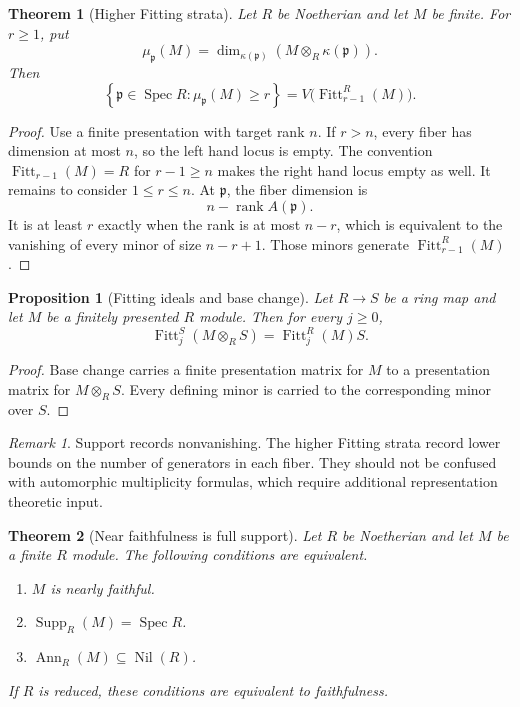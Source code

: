 \documentclass[11pt]{amsart}
\newtheorem{theorem}{Theorem}[section]
\newtheorem{proposition}[proposition]{Proposition}
\theoremstyle{definition}
\theoremstyle{remark}
\newtheorem{remark}[remark]{Remark}
\newcommand{\Spec}{\operatorname{Spec}}
\newcommand{\Supp}{\operatorname{Supp}}
\newcommand{\Ann}{\operatorname{Ann}}
\newcommand{\Fitt}{\operatorname{Fitt}}
\newcommand{\rank}{\operatorname{rank}}
\newcommand{\nil}{\operatorname{Nil}}
\newcommand{\frakp}{\mathfrak p}
\begin{document}
\begin{theorem}[Higher Fitting strata]\label{thm:higher_fitting_strata}
Let \(R\) be Noetherian and let \(M\) be finite. For \(r\geq1\), put
\[
\mu_{\frakp}(M)
=
\dim_{\kappa(\frakp)}
\left(M\otimes_R\kappa(\frakp)\right).
\]
Then
\[
\boxed{
\left\{
\frakp\in\Spec R:
\mu_{\frakp}(M)\geq r
\right\}
=
V\bigl(\Fitt_{r-1}^R(M)\bigr).
}
\]
\end{theorem}

\begin{proof}
Use a finite presentation with target rank \(n\). If \(r>n\), every fiber has dimension at most \(n\), so the left hand locus is empty. The convention \(\Fitt_{r-1}(M)=R\) for \(r-1\geq n\) makes the right hand locus empty as well. It remains to consider \(1\leq r\leq n\). At \(\frakp\), the fiber dimension is
\[
n-\rank A(\frakp).
\]
It is at least \(r\) exactly when the rank is at most \(n-r\), which is equivalent to the vanishing of every minor of size \(n-r+1\). Those minors generate \(\Fitt_{r-1}^R(M)\).
\end{proof}

\begin{proposition}[Fitting ideals and base change]\label{prop:fitting_base_change}
Let \(R\to S\) be a ring map and let \(M\) be a finitely presented \(R\) module. Then for every \(j\geq0\),
\[
\boxed{
\Fitt_j^S(M\otimes_RS)
=
\Fitt_j^R(M)S.
}
\]
\end{proposition}

\begin{proof}
Base change carries a finite presentation matrix for \(M\) to a presentation matrix for \(M\otimes_RS\). Every defining minor is carried to the corresponding minor over \(S\).
\end{proof}

\begin{remark}
Support records nonvanishing. The higher Fitting strata record lower bounds on the number of generators in each fiber. They should not be confused with automorphic multiplicity formulas, which require additional representation theoretic input.
\end{remark}

\begin{theorem}[Near faithfulness is full support]\label{thm:near_faithful_full_support}
Let \(R\) be Noetherian and let \(M\) be a finite \(R\) module. The following conditions are equivalent.
\begin{enumerate}
\item \(M\) is nearly faithful.
\item \(\Supp_R(M)=\Spec R\).
\item \(\Ann_R(M)\subseteq\nil(R)\).
\end{enumerate}
If \(R\) is reduced, these conditions are equivalent to faithfulness.
\end{theorem}
\end{document}
